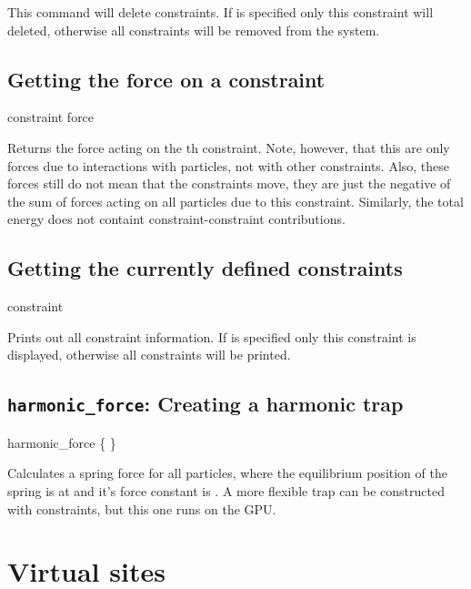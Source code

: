 This command will delete constraints. If  is specified only this
constraint will deleted, otherwise all constraints will be removed from the
system. 

\subsection{Getting the force on a constraint}
\begin{essyntax}
constraint force  
\end{essyntax}
Returns the force acting on the th constraint. Note, however, that this
are only forces due to interactions with particles, not with other constraints.
Also, these forces still do not mean that the constraints move, they are just
the negative of the sum of forces acting on all particles due to this constraint.
Similarly, the total energy does not containt constraint-constraint contributions.


\subsection{Getting the currently defined constraints}
\begin{essyntax}
constraint   
\end{essyntax}
Prints out all constraint information. If  is specified only this
constraint is displayed, otherwise all constraints will be printed.

\subsection{\texttt{harmonic_force}: Creating a harmonic trap}
 \begin{essyntax}
   harmonic_force \{    \} 
  \begin{features}
  \end{features}
 \end{essyntax}

 Calculates a spring force for all particles, where the equilibrium position
 of the spring is at  and it's force constant is . A more
 flexible trap can be constructed with constraints, but this one runs on the GPU.

\section{Virtual sites}
\label{sec:virtual}

